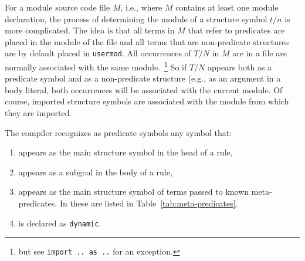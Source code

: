 For a module source code file $M$, i.e., where $M$ contains at least
one module declaration, the process of determining the module of a
structure symbol $t/n$ is more complicated.  The idea is that all
terms in $M$ that refer to predicates are placed in the module of the
file and all terms that are non-predicate structures are by default
placed in {\tt usermod}.  All occurrences of $T/N$ in $M$ are in a
file are normally associated with the same module.~\footnote{but see
  {\tt import .. as ..}  for an exception.}  So if $T/N$ appears both
as a predicate symbol and as a non-predicate structure (e.g., as an
argument in a body literal, both occurrences will be associated with
the current module.  Of course, imported structure symbols are
associated with the module from which they are imported.

The compiler recognizes as predicate symbols any symbol that:
\begin{enumerate}
\item appears as the main structure symbol in the head of a rule,

\item appears as a subgoal in the body of a rule,

\item appears as the main structure symbol of terms passed to known
  meta-predicates.  In \version{} these are listed in
  Table~\ref{tab:meta-predicates}.

\item is declared as {\tt dynamic}.
\end{enumerate}

\begin{table}[tbp]
\caption{Meta-predicates known to XSB's Compiler}\label{tab:meta-predicates}
\end{table}

